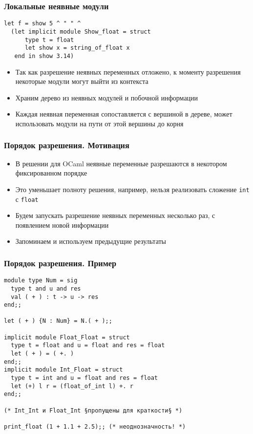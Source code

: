 \documentclass{beamer}
\begin{document}
\lstset{language=caml}
\begin{frame}[fragile]\frametitle{Локальные неявные модули}
\begin{lstlisting}
let f = show 5 ^ " " ^
  (let implicit module Show_float = struct
      type t = float
      let show x = string_of_float x
   end in show 3.14)
\end{lstlisting}
\begin{itemize}
\item Так как разрешение неявных переменных отложено, к моменту разрешения некоторые модули могут выйти из контекста
\item Храним дерево из неявных модулей и побочной информации
\item Каждая неявная переменная сопоставляется с вершиной в дереве, может использовать модули на пути от этой вершины до корня
\end{itemize}
\end{frame}

\begin{frame}\frametitle{Порядок разрешения. Мотивация}
\begin{itemize}
  \item В решении для OCaml неявные переменные разрешаются в некотором фиксированном порядке
  \item Это уменьшает полноту решения, например, нельзя реализовать сложение \texttt{int} с \texttt{float}
  \item Будем запускать разрешение неявных переменных несколько раз, с появлением новой информации
  \item Запоминаем и используем предыдущие результаты
\end{itemize}
\end{frame}

\lstset{language=caml}
\begin{frame}[fragile]\frametitle{Порядок разрешения. Пример}
\begin{lstlisting}
module type Num = sig
  type t and u and res
  val ( + ) : t -> u -> res
end;;

let ( + ) {N : Num} = N.( + );;

implicit module Float_Float = struct
  type t = float and u = float and res = float
  let ( + ) = ( +. )
end;;
implicit module Int_Float = struct
  type t = int and u = float and res = float
  let (+) l r = (float_of_int l) +. r
end;;

(* Int_Int и Float_Int §пропущены для краткости§ *)

print_float (1 + 1.1 + 2.5);; (* неоднозначность! *)
\end{lstlisting}
\end{frame}
\end{document}
